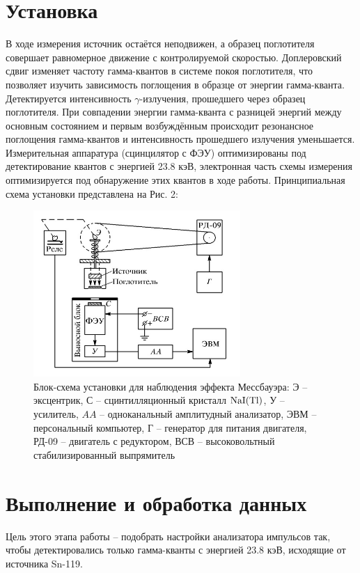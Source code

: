 \documentclass[a4paper,12pt]{article}
\theoremstyle{definition}
\begin{document}
\section*{Установка}
В ходе измерения источник остаётся неподвижен, а образец поглотителя совершает равномерное движение с контролируемой скоростью. Доплеровский сдвиг изменяет частоту гамма-квантов в системе покоя поглотителя, что позволяет изучить зависимость поглощения в образце от энергии гамма-кванта. Детектируется интенсивность $\gamma$-излучения, прошедшего через образец поглотителя. При совпадении энергии гамма-кванта с разницей энергий между основным состоянием и первым возбуждённым происходит резонансное поглощения гамма-квантов и интенсивность прошедшего излучения уменьшается. Измерительная аппаратура (сцинцилятор с ФЭУ) оптимизированы под детектирование квантов с энергией 23.8 кэВ, электронная часть схемы измерения оптимизируется под обнаружение этих квантов в ходе работы. Принципиальная схема установки представлена на Рис. 2:
\begin{figure}[h!]
\begin{center}
\includegraphics[width = 0.7\textwidth]{2} 
\caption{Блок-схема установки для наблюдения эффекта Мессбауэра: Э -- эксцентрик, С -- сцинтилляционный кристалл $\ce{NaI}(\ce{Tl})$, У -- усилитель, $AA$ -- одноканальный амплитудный анализатор, ЭВМ -- персональный компьютер, Г -- генератор для питания двигателя, РД-09 -- двигатель с редуктором, ВСВ -- высоковольтный стабилизированный выпрямитель}
\end{center}
\end{figure}


\section*{Выполнение и обработка данных}
Цель этого этапа работы -- подобрать настройки анализатора импульсов так, чтобы детектировались только гамма-кванты с энергией 23.8 кэВ, исходящие от источника Sn-119.
\end{document}
